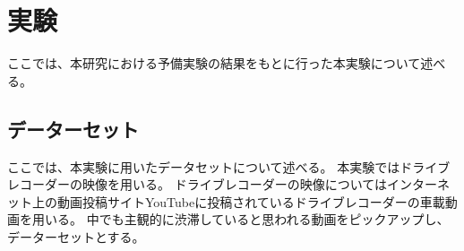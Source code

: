 \chapter{実験}
ここでは、本研究における予備実験の結果をもとに行った本実験について述べる。

\section{データーセット}
ここでは、本実験に用いたデータセットについて述べる。
本実験ではドライブレコーダーの映像を用いる。
ドライブレコーダーの映像についてはインターネット上の動画投稿サイトYouTubeに投稿されているドライブレコーダーの車載動画を用いる。
中でも主観的に渋滞していると思われる動画をピックアップし、データーセットとする。
